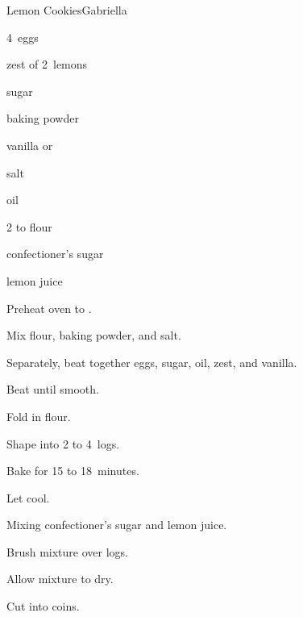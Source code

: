 \begin{recipe}{Lemon Cookies}{Gabriella}{}

\begin{ingredients}
\item 4~eggs
\item zest of 2~lemons
\item \C{\threequarter} sugar
\item {} baking powder
\item {} vanilla or 
\item \tp{\half} salt
\item \C{\threequarter} oil
\item 2 to \C{2\half} flour
\item confectioner's sugar
\item lemon juice
\end{ingredients}

\begin{directions}
\item Preheat oven to .
\item Mix flour, baking powder, and salt.
\item Separately, beat together eggs, sugar, oil, zest, and vanilla.
\item Beat until smooth.
\item Fold in flour.
\item Shape into 2 to 4~logs.
\item Bake for 15 to 18~minutes.
\item Let cool.
\item Mixing confectioner's sugar and lemon juice.
\item Brush mixture over logs.
\item Allow mixture to dry.
\item Cut into coins.
\end{directions}

\end{recipe}
